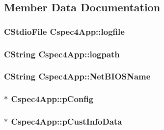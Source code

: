 \subsection{Member Data Documentation}
\hypertarget{classCspec4App_ab5f5e62030d168cc83b9223f33c38049}{
\subsubsection[{logfile}]{\setlength{\rightskip}{0pt plus 5cm}CStdioFile {\bf Cspec4App::logfile}}}
\label{classCspec4App_ab5f5e62030d168cc83b9223f33c38049}
\hypertarget{classCspec4App_a181254d816e490e80677460212fdd019}{
\subsubsection[{logpath}]{\setlength{\rightskip}{0pt plus 5cm}CString {\bf Cspec4App::logpath}}}
\label{classCspec4App_a181254d816e490e80677460212fdd019}
\hypertarget{classCspec4App_a0316d29bbb6effdc7bfddc616e781a1b}{
\subsubsection[{NetBIOSName}]{\setlength{\rightskip}{0pt plus 5cm}CString {\bf Cspec4App::NetBIOSName}}}
\label{classCspec4App_a0316d29bbb6effdc7bfddc616e781a1b}
\hypertarget{classCspec4App_a4e930236aeb3c7e48f1cb2cd11678959}{
\subsubsection[{pConfig}]{$\ast$ {\bf Cspec4App::pConfig}}}
\label{classCspec4App_a4e930236aeb3c7e48f1cb2cd11678959}
\hypertarget{classCspec4App_a06bded385a1b1084d5c65725c7509b88}{
\subsubsection[{pCustInfoData}]{$\ast$ {\bf Cspec4App::pCustInfoData}}}

